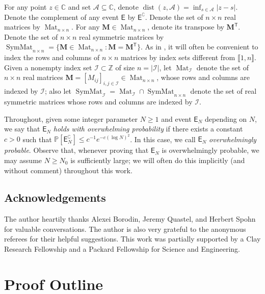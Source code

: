 \documentclass{amsart}
\numberwithin{equation}{section}
\DeclareMathOperator{\Mat}{Mat}
\DeclareMathOperator{\SymMat}{SymMat}
\DeclareMathOperator{\dist}{dist}
\theoremstyle{remark}
\theoremstyle{definition}
\begin{document}
	\label{Notation} 
	
	For any point $z \in \mathbb{C}$ and set $\mathcal{A} \subseteq \mathbb{C}$, denote $\dist (z, \mathcal{A}) = \inf_{s \in \mathcal{A}} |z-s|$. Denote the complement of any event $\mathsf{E}$ by $\mathsf{E}^{\complement}$. Denote the set of $n \times n$ real matrices by $\Mat_{n \times n}$. For any $\bm{M} \in \Mat_{n \times n}$, denote its transpose by $\bm{M}^{\mathsf{T}}$. Denote the set of $n \times n$ real symmetric matrices by $\SymMat_{n \times n} = \{ \bm{M} \in \Mat_{n \times n} : \bm{M} = \bm{M}^{\mathsf{T}} \}$. As in , it will often be convenient to index the rows and columns of $n \times n$ matrices by index sets different from $\llbracket 1, n \rrbracket$. Given a nonempty index set $\mathscr{I} \subset \mathbb{Z}$ of size $n = |\mathscr{I}|$, let $\Mat_{\mathscr{I}}$ denote the set of $n \times n$ real matrices $\bm{M} = [M_{ij}]_{i,j \in \mathscr{I}} \in \Mat_{n \times n}$, whose rows and columns are indexed by $\mathscr{I}$; also let $\SymMat_{\mathscr{I}} = \Mat_{\mathscr{I}} \cap \SymMat_{n \times n}$ denote the set of real symmetric matrices whose rows and columns are indexed by $\mathscr{I}$. 
	
	
	Throughout, given some integer parameter $N \ge 1$ and event $\mathsf{E}_N$ depending on $N$, we say that $\mathsf{E}_N$ \emph{holds with overwhelming probability} if there exists a constant $c > 0$ such that $\mathbb{P} [\mathsf{E}_N^{\complement}] \le c^{-1} e^{-c(\log N)^2}$. In this case, we call $\mathsf{E}_N$ \emph{overwhelmingly probable}. Observe that, whenever proving that $\mathsf{E}_N$ is overwhelmingly probable, we may assume $N \ge N_0$ is sufficiently large; we will often do this implicitly (and without comment) throughout this work. 
	
	
	\subsection*{Acknowledgements} 
	
	The author heartily thanks Alexei Borodin, Jeremy Quastel, and Herbert Spohn for valuable conversations. The author is also very grateful to the anonymous referees for their helpful suggestions. This work was partially supported by a Clay Research Fellowship and a Packard Fellowship for Science and Engineering.
	
	
	
	
	\section{Proof Outline} 
	
\end{document}
